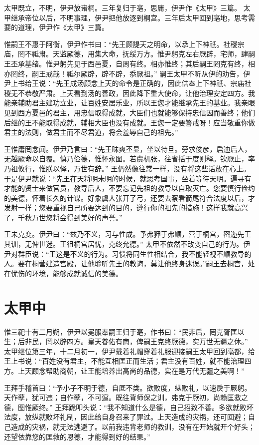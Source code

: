 \documentclass[a4paper,12pt,UTF8,twoside]{ctexbook}
\begin{document}
太甲既立，不明，伊尹放诸桐。三年复归于亳，思庸，伊尹作《太甲》三篇。
太甲继承帝位以后，不明事理，伊尹把他放逐到桐宫。三年后太甲回到亳地，思考需要的道理，伊尹作《太甲》三篇。

惟嗣王不惠于阿衡，伊尹作书曰：“先王顾諟天之明命，以承上下神祇。社稷宗庙，罔不祗肃。天监厥德，用集大命，抚绥万方。惟尹躬克左右厥辟，宅师，肆嗣王丕承基绪。惟尹躬先见于西邑夏，自周有终。相亦惟终；其后嗣王罔克有终，相亦罔终，嗣王戒哉！祗尔厥辟，辟不辟，忝厥祖。”
嗣王太甲不听从伊的劝告，伊尹上书给王说：“先王成汤顾念上天的命令是正确的，因此供奉上下神祇、宗庙社稷无不恭敬严肃。上天看到汤的善政，因此降下重大使命，让他治理安定四方。我能亲辅助君主建功立业，让百姓安居乐业，所以王您才能继承先王的基业。我亲眼见到西方夏邑的君主，用忠信取得成就，大臣们也就能够保持忠信因而善终；他们后继的王不能取得成就，辅相大臣也没有成就。王您一定要警戒呀！应当敬重你做君主的法则，做君主而不尽君道，将会羞辱自己的祖先。”

王惟庸罔念闻。伊尹乃言曰：“先王昧爽丕显，坐以待旦。旁求俊彦，启迪后人，无越厥命以自覆。慎乃俭德，惟怀永图。若虞机张，往省括于度则释。钦厥止，率乃祖攸行，惟朕以怿，万世有辞。”
王仍然像往常一样，没有将这些话放在心上。于是伊尹就说：“先王在天将明未明的时候，就思考国事，坐着等待天明。遍寻有才能的贤士来做官员，教导后人，不要忘记先祖的教导以自取灭亡。您要慎行俭约的美德，怀着长久的计谋。好象虞人张开了弓，还要去察看箭尾符合法度以后，才发射一样；您要重视自己所要达到的目的，遵行你的祖先的措施！这样我就高兴了，千秋万世您将会得到美好的声誉。”

王未克变。伊尹曰：“兹乃不义，习与性成。予弗狎于弗顺，营于桐宫，密迩先王其训，无俾世迷。王徂桐宫居忧，克终允德。”
太甲不依然不改变自己的行为。伊尹对群臣说：“王这是不义的行为。习惯将同生性相结合，我不能轻视不顺教导的人。要在桐营建造宫殿，让他聆听先王的教诲，莫让他终身迷误。”嗣王去桐宫，处在忧伤的环境，能够成就诚信的美德。

\chapter{太甲中}

惟三祀十有二月朔，伊尹以冕服奉嗣王归于亳，作书曰：“民非后，罔克胥匡以生；后非民，罔以辟四方。皇天眷佑有商，俾嗣王克终厥德，实万世无疆之休。”
太甲继位第三年，十二月初一，伊尹戴着礼帽穿着礼服迎接嗣王太甲回到亳都，给王上书说：“百姓没有君主，不能互相匡正而生活；君主没有百姓，就不能治理四方。上天顾念帮助商朝，让王能培养出高尚的品德，实在是万代无疆之美啊！”

王拜手稽首曰：“予小子不明于德，自厎不类。欲败度，纵败礼，以速戾于厥躬。天作孽，犹可违；自作孽，不可逭。既往背师保之训，弗克于厥初，尚赖匡救之德，图惟厥终。”
王拜跪叩头说：“我不知道什么是德，自己招致不善。多欲就败坏法度，放纵就败坏礼制，因此给自身召来了罪过。上天造成的灾祸，还可回避；自己造成的灾祸，就无法逃避了。以前我违背老师的教训，没有在开始就开个好头；还望依靠您的匡救的恩德，才能得到好的结果。”
\end{document}
